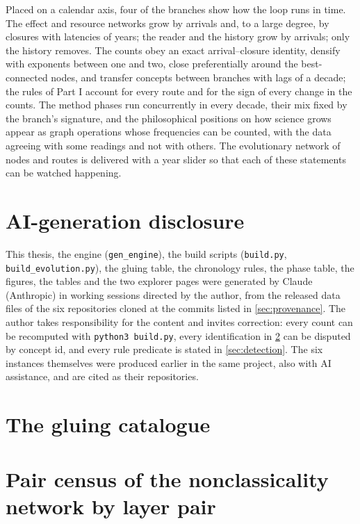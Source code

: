 \documentclass[11pt,a4paper,twoside,openany]{report}
\theoremstyle{plain}
\theoremstyle{definition}
\theoremstyle{remark}
\begin{document}
Placed on a calendar axis, four of the branches show how the loop runs in time. The effect and resource networks grow by arrivals and, to a large degree, by closures with latencies of years; the reader and the history grow by arrivals; only the history removes. The counts obey an exact arrival--closure identity, densify with exponents between one and two, close preferentially around the best-connected nodes, and transfer concepts between branches with lags of a decade; the rules of Part I account for every route and for the sign of every change in the counts. The method phases run concurrently in every decade, their mix fixed by the branch's signature, and the philosophical positions on how science grows appear as graph operations whose frequencies can be counted, with the data agreeing with some readings and not with others. The evolutionary network of \EmergedV{} nodes and \EmergedE{} routes is delivered with a year slider so that each of these statements can be watched happening.

\chapter{AI-generation disclosure}\label{ch:ai}
This thesis, the engine (\texttt{gen\_engine}), the build scripts (\texttt{build.py}, \texttt{build\_evolution.py}), the gluing table, the chronology rules, the phase table, the figures, the tables and the two explorer pages were generated by Claude (Anthropic) in working sessions directed by the author, from the released data files of the six repositories cloned at the commits listed in \cref{sec:provenance}. The author takes responsibility for the content and invites correction: every count can be recomputed with \texttt{python3 build.py}, every identification in \cref{app:concepts} can be disputed by concept id, and every rule predicate is stated in \cref{sec:detection}. The six instances themselves were produced earlier in the same project, also with AI assistance, and are cited as their repositories.

\appendix
\chapter{The gluing catalogue}\label{app:concepts}
\scriptsize

\normalsize

\chapter{Pair census of the nonclassicality network by layer pair}\label{app:pairs}
\small

\normalsize
\end{document}
